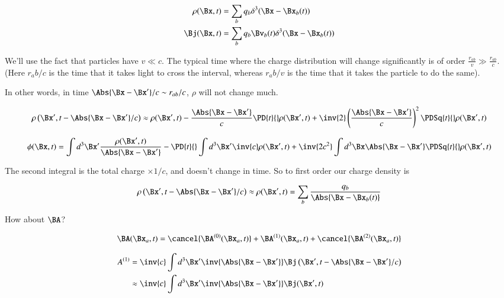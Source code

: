 \begin{align}\label{eqn:relativisticElectrodynamicsL25:230}
\rho(\Bx, t) &= \sum_b q_b \delta^3 (\Bx - \Bx_b(t)) \\
\Bj(\Bx, t) &= \sum_b q_b \Bv_b(t) \delta^3 (\Bx - \Bx_b(t))
\end{align}

We'll use the fact that particles have $v \ll c$.  The typical time where the charge distribution will change significantly is of order $\frac{r_{ab}}{v} \gg \frac{r_{ab}}{c}$.  (Here $r_ab/c$ is the time that it takes light to cross the interval, whereas $r_ab/v$ is the time that it takes the particle to do the same).

In other words, in time $\Abs{\Bx - \Bx'}/c \sim r_{ab}/c$, $\rho$ will not change much.

\begin{equation}\label{eqn:relativisticElectrodynamicsL25:250}
\rho\left(\Bx', t - \Abs{\Bx - \Bx'}/c\right) \approx \rho(\Bx', t) 
- \frac{\Abs{\Bx - \Bx'}}{c} \PD{t}{} \rho(\Bx', t) + \inv{2} \left(\frac{\Abs{\Bx - \Bx'}}{c}\right)^2 \PDSq{t}{} \rho(\Bx', t) 
\end{equation}

\begin{equation}\label{eqn:relativisticElectrodynamicsL25:270}
\phi(\Bx, t) 
= \int d^3 \Bx' \frac{\rho(\Bx', t)}{\Abs{\Bx - \Bx'}} - \PD{t}{} \int d^3 \Bx' \inv{c} \rho(\Bx', t) 
+
\inv{2 c^2} \int d^3 \Bx \Abs{\Bx - \Bx'} \PDSq{t}{} \rho(\Bx', t) 
\end{equation}

The second integral is the total charge $\times 1/c$, and doesn't change in time.  So to first order our charge density is

\begin{equation}\label{eqn:relativisticElectrodynamicsL25:290}
\rho\left(\Bx', t - \Abs{\Bx - \Bx'}/c\right) \approx \rho(\Bx', t) = \sum_b \frac{q_b}{\Abs{\Bx - \Bx_b(t)}}
\end{equation}


How about $\BA$?

\begin{equation}\label{eqn:relativisticElectrodynamicsL25:310}
\BA(\Bx_a, t) = 
\cancel{\BA^{(0)}(\Bx_a, t)}
+\BA^{(1)}(\Bx_a, t)
+\cancel{\BA^{(2)}(\Bx_a, t)}
\end{equation}

\begin{align*}
A^{(1)} 
&= \inv{c} \int d^3 \Bx' \inv{\Abs{\Bx - \Bx'}} \Bj\left(\Bx', t - \Abs{\Bx - \Bx'}/c\right)  \\
&\approx \inv{c} \int d^3 \Bx' \inv{\Abs{\Bx - \Bx'}} \Bj(\Bx', t)
\end{align*}

